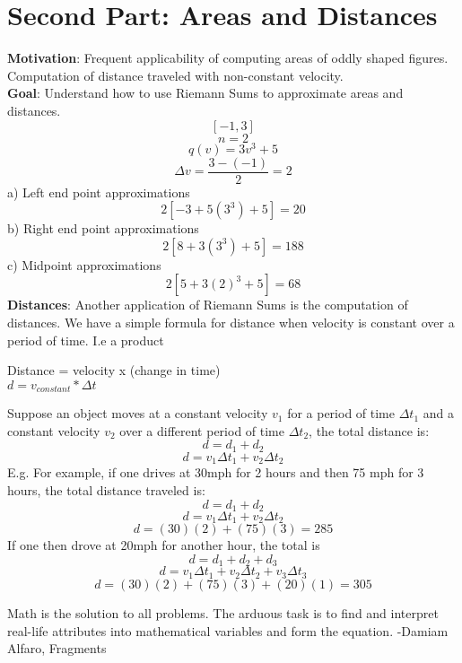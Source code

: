 \documentclass[12pt, letterpaper]{article}
\begin{document}
\section{Second Part: Areas and Distances}
\textbf{Motivation}: Frequent applicability of computing areas of oddly shaped figures. Computation of distance traveled with non-constant velocity.\\
\newline
\textbf{Goal}: Understand how to use Riemann Sums to approximate areas and distances.
\[[-1,3]\]
\[n=2\]
\[q(v)=3v^3+5\]
\[\Delta v = \frac{3-(-1)}{2}=2\]
a) Left end point approximations
\[2[-3+5(3^3)+5]=20\]
b) Right end point approximations
\[2[8+3(3^3)+5]=188\]
c) Midpoint approximations
\[2[5+3(2)^3+5]=68\]
\textbf{Distances}: Another application of Riemann Sums is the computation of distances. We have a simple formula for distance when velocity is constant over a period of time. I.e a product
\begin{center}
    Distance = velocity x (change in time)\\
    \(d=v_{constant}*\Delta t\)
\end{center}
Suppose an object moves at a constant velocity \(v_1\) for a period of time \(\Delta t_1\) and a constant velocity \(v_2\) over a different period of time \(\Delta t_2\), the total distance is:
\[d = d_1 + d_2\]
\[d = v_1 \Delta t_1 + v_2 \Delta t_2\]
E.g. For example, if one drives at 30mph for 2 hours and then 75 mph for 3 hours, the total distance traveled is:
\[d = d_1 + d_2\]
\[d = v_1 \Delta t_1 + v_2 \Delta t_2\]
\[d = (30)(2)+(75)(3) = 285\]
If one then drove at 20mph for another hour, the total is
\[d = d_1 + d_2 + d_3\]
\[d = v_1 \Delta t_1 + v_2 \Delta t_2 + v_3 \Delta t_3\]
\[d = (30)(2)+(75)(3)+(20)(1) = 305\]
\newline
\newline

Math is the solution to all problems. The arduous task is to find and interpret real-life attributes into mathematical variables and form the equation. 
-Damiam Alfaro, Fragments
\end{document}
